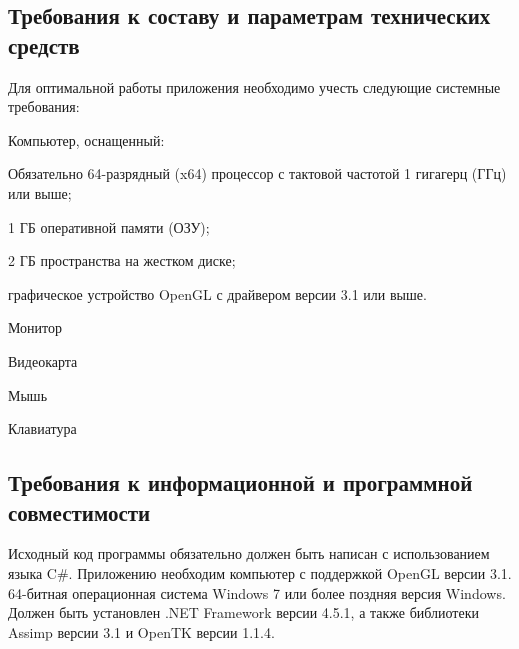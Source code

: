 \subsection{Требования к составу и параметрам технических средств}
Для оптимальной работы приложения необходимо учесть следующие системные требования:
\begin{my_enumerate}
\item Компьютер, оснащенный:
    \begin{my_enumerate}
    \item Обязательно 64-разрядный (x64) процессор с тактовой частотой 1 гигагерц (ГГц) или выше;
    \item 1 ГБ оперативной памяти (ОЗУ);
    \item 2 ГБ пространства на жестком диске;
    \item графическое устройство OpenGL с драйвером версии 3.1 или выше.
    \end{my_enumerate}
\item Монитор
\item Видеокарта
\item Мышь
\item Клавиатура
\end{my_enumerate}


\subsection{Требования к информационной и программной совместимости}
Исходный код программы обязательно должен быть написан с использованием языка C\#. Приложению необходим компьютер с поддержкой OpenGL версии 3.1. 64-битная операционная система Windows 7 или более поздняя версия Windows. Должен быть установлен .NET Framework версии 4.5.1, а также библиотеки Assimp версии 3.1 и OpenTK версии 1.1.4.

